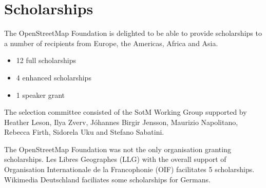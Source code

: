 \newpage
\section*{Scholarships}
\label{scholarships}
\pagestyle{cropmarksstyle}

The OpenStreetMap Foundation is delighted to be able to provide scholarships to a number of
recipients from Europe, the Americas, Africa and Asia.

\begin{itemize}
  \setlength{\itemsep}{0pt}
  \item 12 full scholarships
  \item 4 enhanced scholarships
  \item 1 speaker grant
\end{itemize}

The selection committee consisted of the SotM Working Group supported by Heather Leson, Ilya Zverv,
Jóhannes Birgir Jensson, Maurizio Napolitano, Rebecca Firth, Sidorela Uku and Stefano Sabatini.

The OpenStreetMap Foundation was not the only organisation granting scholarships.  Les Libres
Geographes (LLG) with the overall support of Organisation Internationale de la Francophonie (OIF)
facilitates 5 scholarships. Wikimedia Deutschland faciliates some scholarships for Germans.
